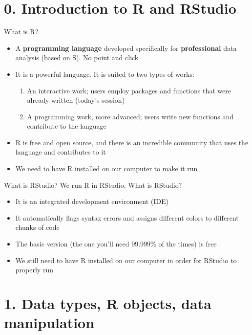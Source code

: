 \documentclass[xcolor=table,dvipsnames]{beamer}
\begin{document}
\section{0. Introduction to R and RStudio}

\begin{frame}{What is R?}
\begin{itemize}
\item A \textbf{programming language} developed specifically for \textbf{professional} data analysis (based on S). \pause No point and click \pause
\item It is a powerful language. It is suited to two types of works: \pause
	\begin{enumerate}
	\item An interactive work; users employ packages and functions that were already written (today's session) \pause
	\item A programming work, more advanced; users write new functions and contribute to the language \pause
	\end{enumerate}
\item R is free and open source, and there is an incredible community that uses the language and contributes to it \pause
\item We need to have R installed on our computer to make it run
\end{itemize}
\end{frame}

\begin{frame}{What is RStudio?}
We run R in RStudio. What is RStudio? \pause
\begin{itemize}
\item It is an integrated development environment (IDE) \pause
\item It automatically flags syntax errors and assigns different colors to different chunks of code \pause
\item The basic version (the one you'll need 99.999\% of the times) is free \pause
\item We still need to have R installed on our computer in order for RStudio to properly run
\end{itemize}

\end{frame}

\section{1. Data types, R objects, data manipulation}
\end{document}
